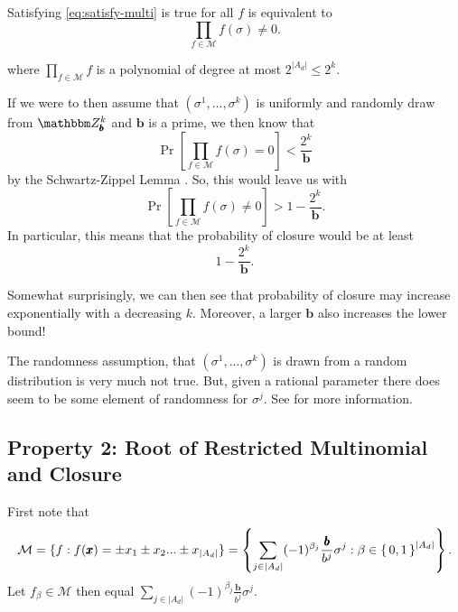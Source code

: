 \documentclass[11pt,titlepage]{article}
\newcommand{\digSumPeriodic}{\sigma^j}
\newcommand{\digSumPeriodicNoJ}{{\sigma}}
\newcommand{\commonBase}{{\pmb{b}}}
\newcommand{\numbToCommon}{\frac{\commonBase}{b^j}}
\begin{document}
Satisfying \eqref{eq:satisfy-multi} is true for all $f$ is equivalent to
$$
  \prod_{f \in \mathcal{M}} f(\digSumPeriodicNoJ) \neq 0.
$$

where $\prod_{f \in \mathcal{M}} f$ is a polynomial of degree
at most $2^{|A_d|} \leq 2^k$.

If we were to then assume that $(\digSumPeriodicNoJ^1, ..., \digSumPeriodicNoJ^k)$ 
is uniformly and randomly draw from $\Z_\commonBase^k$ and $\commonBase$ is a prime, we then know that
$$
  \Pr\left[\prod_{f \in \mathcal{M}} f(\digSumPeriodicNoJ) = 0\right] < \frac{2^k}{\commonBase}
$$
by the Schwartz-Zippel Lemma \cite{Shwartz} \cite{Zip}.
So, this would leave us with
$$
  \Pr\left[\prod_{f \in \mathcal{M}} f(\digSumPeriodicNoJ) \neq 0\right] > 1 - \frac{2^k}{\commonBase}.
$$
In particular, this means that the probability of closure would be at least
$$
1 - \frac{2^k}{\commonBase}.
$$

Somewhat surprisingly, we can then see that probability of closure may increase exponentially
with a decreasing $k$. Moreover, a larger $\commonBase$ also increases the lower bound!

\begin{remark}
\label{remark:digSumRandomness}
  The randomness assumption, that $(\digSumPeriodicNoJ^1, ..., \digSumPeriodicNoJ^k)$
  is drawn from a random distribution is very much not true. But, given a rational parameter
  there does seem to be some element of randomness for $\digSumPeriodic$. See \cite{OnDecSeq} for more information.
\end{remark}

\subsection{Property 2: Root of Restricted Multinomial and Closure}
First note that
$$
\mathcal{M} = \{f : f(\pmb{x}) = \pm x_1 \pm x_2 ... \pm x_{|A_d|}\} = 
  \left\{\sum_{j \in |A_d|} (-1)^{\beta_j} \numbToCommon \digSumPeriodic : \beta \in \set{0, 1}^{|A_d|} \right\}.
$$
Let $f_\beta \in \mathcal{M}$ then equal $\sum_{j \in |A_d|} (-1)^{\beta_j}\numbToCommon \digSumPeriodic$.
\end{document}

